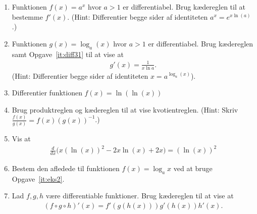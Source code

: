 \begin{enumerate}
	\item \label{it:diff31} Funktionen $f(x)=a^x$ hvor $a>1$ er differentiabel. Brug kædereglen til at bestemme $f'(x)$. (Hint: Differentier begge sider af identiteten $a^x=e^{x\ln(a)}$.)

	\item Funktionen $g(x)=\log_a(x)$ hvor $a>1$ er differentiabel. Brug kædereglen samt Opgave~\ref{it:diff31} til at vise at
	\begin{align*}
	g'(x)=\frac{1}{x\ln a}.
	\end{align*}
	(Hint: Differentier begge sider af identiteten $x=a^{\log_a(x)}$).
	
	\item Differentier funktionen $ f(x)=\ln(\ln(x)) $

	
	\item Brug produktreglen og kædereglen til at vise kvotientreglen. (Hint: Skriv $\frac{f(x)}{g(x)}=f(x)(g(x))^{-1} $.)
	
	
	\item\label{it:diff32} Vis at
	\begin{align*}
	\frac{d}{dx}\Big( x(\ln(x))^2 -2x\ln(x)+2x\Big)=(\ln(x))^2
	\end{align*}
	
	
	
	\item Bestem den afledede til funktionen $f(x)=\log_a x$ ved at bruge Opgave~\ref{it:eks2}.
	
	\item Lad $f,g,h$ være differentiable funktioner. Brug kædereglen til at vise at
	\begin{align*}
	(f\circ g \circ h)'(x)=f'(g(h(x)))g'(h(x))h'(x).
	\end{align*}
\end{enumerate}